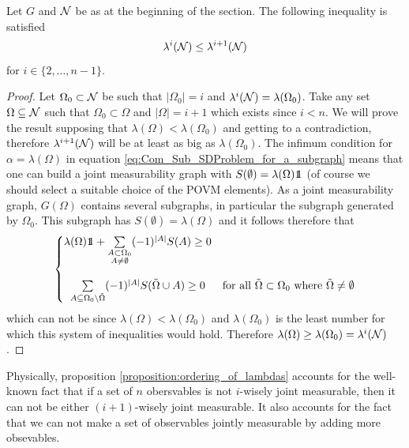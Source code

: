 \documentclass[10pt, a4paper]{amsart}
\begin{document}
\begin{proposition}\label{proposition:ordering_of_lambdas}
Let $G$ and $\mathcal{N}$ be as at the beginning of the section. The following inequality  is satisfied
$$
\lambda^{i}(\mathcal{N})\leq \lambda^{i+1}(\mathcal{N})
$$
for $i\in\{2, \ldots, n-1\}$. 

\end{proposition}
\begin{proof}
Let $\Omega_{0}\subset \mathcal{N}$ be such that $|\Omega_{0}| = i$ and $\lambda^{i}(\mathcal{N}) = \lambda(\Omega_{0})$. Take any set $\Omega \subseteq \mathcal{N}$ such that $\Omega_{0}\subset \Omega$ and $|\Omega| = i+1$ which exists since $i<n$. We will prove the result supposing that $\lambda (\Omega ) < \lambda( \Omega_{0} ) $ and getting to a contradiction, therefore $\lambda^{i+1}(\mathcal{N})$ will be at least as big as $\lambda(\Omega_{0})$. The infimum condition for $\alpha  = \lambda(\Omega)$ in equation \ref{eq:Com_Sub_SDProblem_for_a_subgraph} 
means that one can build a joint measurability graph with $S(\emptyset ) = \lambda (\Omega ) \bbone $ (of course we should select a suitable choice of the POVM elements). 
As a joint measurability graph, $G(\Omega)$ contains several subgraphs, in particular the subgraph generated by $\Omega_{0}$. This subgraph has $S(\emptyset )  = \lambda( \Omega)$ and it follows therefore that 
$$
\left\{
\begin{matrix}
\lambda(\Omega) \bbone + \sum\limits_{\substack{A\subset \Omega_{0}\\ A\neq \emptyset}}(-1)^{|A|}S(A)\geq 0\\
\\
\sum\limits_{A\subseteq \Omega_{0} \backslash \tilde{\Omega}} (-1)^{|A|}S(\tilde{\Omega}\cup A) \geq 0
&
\mbox{for all } \tilde{\Omega} \subset \Omega_{0} \mbox{ where } \tilde{\Omega} \neq \emptyset
\end{matrix}
\right.
$$
which can not be since $\lambda(\Omega ) < \lambda(\Omega_{0})$ and $\lambda(\Omega_{0})$ is the least number for which this system of inequalities would hold. Therefore $\lambda(\Omega) \geq \lambda(\Omega_{0}) = \lambda^{i}(\mathcal{N})$.
\end{proof}

Physically, proposition \ref{proposition:ordering_of_lambdas} accounts for the well-known fact that if a set of $n$ obersvables is not
$i$-wisely joint measurable, then it can not be either $(i+1)$-wisely joint measurable.
It also accounts for the fact that we can not make a set of observables jointly measurable by adding more obsevables.  \\
\end{document}

